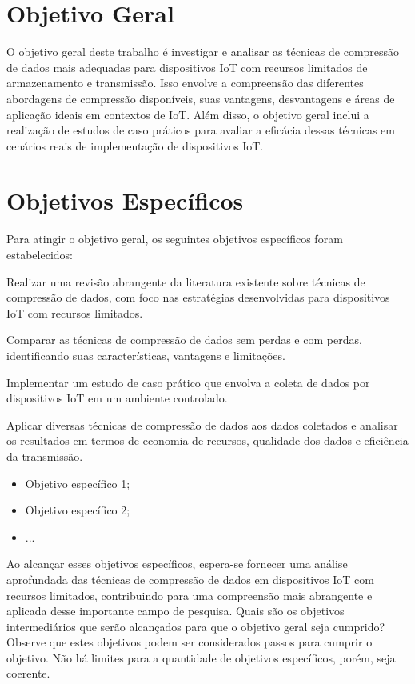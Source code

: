 \section{Objetivo Geral}
\label{sec:ObjGeral}
O objetivo geral deste trabalho é investigar e analisar as técnicas de compressão de dados mais adequadas para dispositivos IoT com recursos limitados de armazenamento e transmissão. Isso envolve a compreensão das diferentes abordagens de compressão disponíveis, suas vantagens, desvantagens e áreas de aplicação ideais em contextos de IoT. Além disso, o objetivo geral inclui a realização de estudos de caso práticos para avaliar a eficácia dessas técnicas em cenários reais de implementação de dispositivos IoT.

\section{Objetivos Específicos}
\label{sec:ObjEspecificos}
Para atingir o objetivo geral, os seguintes objetivos específicos foram estabelecidos:

    Realizar uma revisão abrangente da literatura existente sobre técnicas de compressão de dados, com foco nas estratégias desenvolvidas para dispositivos IoT com recursos limitados.

    Comparar as técnicas de compressão de dados sem perdas e com perdas, identificando suas características, vantagens e limitações.

    Implementar um estudo de caso prático que envolva a coleta de dados por dispositivos IoT em um ambiente controlado.

    Aplicar diversas técnicas de compressão de dados aos dados coletados e analisar os resultados em termos de economia de recursos, qualidade dos dados e eficiência da transmissão.

\begin{itemize}
    \item Objetivo específico 1;
    \item Objetivo específico 2;
    \item ...
\end{itemize}
Ao alcançar esses objetivos específicos, espera-se fornecer uma análise aprofundada das técnicas de compressão de dados em dispositivos IoT com recursos limitados, contribuindo para uma compreensão mais abrangente e aplicada desse importante campo de pesquisa.
Quais são os objetivos intermediários que serão alcançados para que o objetivo geral seja cumprido? Observe que estes objetivos podem ser considerados passos para cumprir o objetivo. Não há limites para a quantidade de objetivos específicos, porém, seja coerente.
